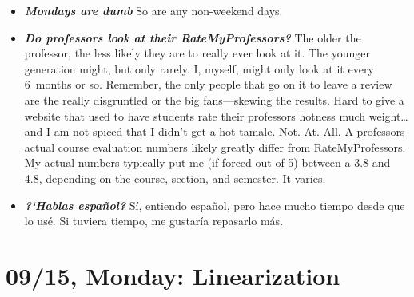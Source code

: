\documentclass[11pt,letterpaper]{article}
\begin{document}
\begin{itemize}
\item {\bfseries\itshape Mondays are dumb} So are any non-weekend days.

\item {\bfseries\itshape Do professors look at their RateMyProfessors?} The older the professor, the less likely they are to really ever look at it. The younger generation might, but only rarely. I, myself, might only look at it every 6~months or so. Remember, the only people that go on it to leave a review are the really disgruntled or the big fans---skewing the results. Hard to give a website that used to have students rate their professors hotness much weight\dots and I am not spiced that I didn't get a hot tamale. Not. At. All. A professors actual course evaluation numbers likely greatly differ from RateMyProfessors. My actual numbers typically put me (if forced out of 5) between a 3.8 and 4.8, depending on the course, section, and semester. It varies. 

\item {\bfseries\itshape ?`Hablas espa\~nol?} S\'i, entiendo espa\~nol, pero hace mucho tiempo desde que lo us\'e. Si tuviera tiempo, me gustar\'ia repasarlo m\'as. 
\end{itemize}

\newpage
\section*{09/15, Monday: Linearization\label{09-15}}
\end{document}
